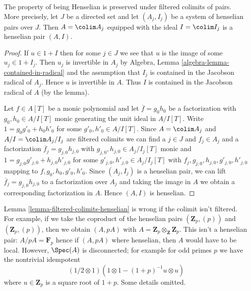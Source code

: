 \begin{lemma}
\label{lemma-filtered-colimits-henselian}
The property of being Henselian is preserved under filtered colimits of pairs.
More precisely, let $J$ be a directed set and let $(A_j, I_j)$
be a system of henselian pairs over $J$.
Then $A = \colim A_j$ equipped with the ideal $I = \colim I_j$
is a henselian pair $(A, I)$.
\end{lemma}

\begin{proof}
If $u \in 1 + I$ then for some $j \in J$ we see that $u$ is the
image of some $u_j \in 1 + I_j$. Then $u_j$ is invertible in $A_j$ by
Algebra, Lemma \ref{algebra-lemma-contained-in-radical}
and the assumption that $I_j$ is contained in the Jacobson radical of $A_j$.
Hence $u$ is invertible in $A$. Thus $I$
is contained in the Jacobson radical of $A$ (by the lemma).

\medskip\noindent
Let $f \in A[T]$ be a monic polynomial and let $\overline{f} = g_0 h_0$
be a factorization with $g_0, h_0 \in A/I[T]$ monic generating the unit
ideal in $A/I[T]$. Write $1 = g_0 g'_0 + h_0 h'_0$ for some
$g'_0, h'_0 \in A/I[T]$. Since $A = \colim A_j$ and $A/I = \colim A_j/I_j$
are filtered colimits we can find a $j \in J$ and $f_j \in A_j$ and
a factorization $\overline{f}_j = g_{j, 0} h_{j, 0}$
with $g_{j, 0}, h_{j, 0} \in A_j/I_j[T]$ monic
and $1 = g_{j, 0} g'_{j, 0} + h_{j, 0} h'_{j, 0}$
for some $g'_{j, 0}, h'_{j, 0} \in A_j/I_j[T]$ with
$f_j, g_{j, 0}, h_{j, 0}, g'_{j, 0}, h'_{j, 0}$
mapping to $f, g_0, h_0, g'_0, h'_0$.
Since $(A_j, I_j)$ is a henselian pair, we can lift
$\overline{f}_j = g_{j, 0} h_{j, 0}$ to a factorization
over $A_j$ and taking the image in $A$ we obtain a
corresponding factorization in $A$. Hence $(A, I)$ is henselian.
\end{proof}

\begin{example}
\label{example-moret-bailly}
Lemma \ref{lemma-filtered-colimits-henselian} is wrong if the colimit
isn't filtered. For example, if we take the coproduct of the
henselian pairs $(\mathbf{Z}_p, (p))$ and $(\mathbf{Z}_p, (p))$, then we 
obtain $(A, pA)$ with $A = \mathbf{Z}_p \otimes_\mathbf{Z} \mathbf{Z}_p$.
This isn't a henselian pair: $A/pA = \mathbf{F}_p$ hence if $(A, pA)$
where henselian, then $A$ would have to be local. However, $\Spec(A)$
is disconnected; for example for odd primes $p$ we have the nontrivial
idempotent
$$
(1/2 \otimes 1)
\left(1 \otimes 1 - (1 + p)^{-1}u \otimes u\right)
$$
where $u \in \mathbf{Z}_p$ is a square root of $1 + p$. Some details omitted.
\end{example}

